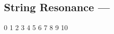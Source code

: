 \subsection[String Resonance]{String Resonance --- \UiKey{\I}\UiKey{\SET}}









































0
1
2
3
4
5
6
7
8
9
10
